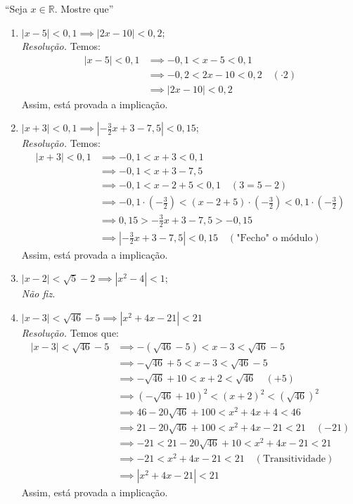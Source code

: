\enquote{Seja $x \in \mathbb{R}$. Mostre que}
\begin{enumerate}
    \item $|x - 5| < 0,1 \implies |2x - 10| < 0,2$;
    \\ \emph{Resolução.} Temos:
    \begin{align*}
        |x - 5| < 0,1 & \implies
        -0,1 < x - 5 < 0,1 \\ & \implies
        -0,2 < 2x - 10 < 0,2 \quad (\cdot 2) \\ & \implies
        |2x - 10| < 0,2
    \end{align*}
    Assim, está provada a implicação.
    \item $|x + 3| < 0,1 \implies |-\frac{3}{2}x + 3 - 7,5| < 0,15$;
    \\ \emph{Resolução.} Temos:
    \begin{align*}
        |x + 3| < 0,1 & \implies -0,1 < x + 3 < 0,1 \\ & \implies
        -0,1 < x + 3 - 7,5 \\ & \implies
        -0,1 < x - 2 + 5 < 0,1 \quad (3 = 5 - 2) \\ & \implies 
        -0,1 \cdot (-\frac{3}{2}) < (x - 2 + 5) \cdot (-\frac{3}{2}) < 0,1 \cdot (-\frac{3}{2}) \\ & \implies
        0,15 > -\frac{3}{2}x + 3 - 7,5 > -0,15 \\ & \implies
        |-\frac{3}{2}x + 3 - 7,5| < 0,15 \quad (\text{"Fecho" o módulo})
    \end{align*}
    Assim, está provada a implicação.
    \item $|x - 2| < \sqrt{5} - 2 \implies |x^2 - 4| < 1$;
    \\ \emph{Não fiz.}
    \item $|x -3| < \sqrt{46} - 5 \implies |x^2 + 4x - 21| < 21$
    \\ \emph{Resolução.} Temos que:
    \begin{align*}
        |x - 3| < \sqrt{46} - 5 & \implies
        -(\sqrt{46} - 5) < x - 3 < \sqrt{46} -5 \\ & \implies
         -\sqrt{46} + 5 < x - 3 < \sqrt{46} -5 \\ & \implies
         -\sqrt{46} +10 < x + 2 < \sqrt{46} \quad (+5) \\ & \implies
         (-\sqrt{46} + 10)^2 < (x + 2)^2 < (\sqrt{46})^2 \\ & \implies
         46 - 20\sqrt{46} + 100 < x^2 + 4x + 4 < 46 \\ & \implies
         21 - 20\sqrt{46} + 100 < x^2 + 4x - 21 < 21 \quad (-21) \\ & \implies
         -21 < 21 - 20 \sqrt{46} + 10 < x^2 + 4x - 21 < 21 \\ & \implies 
         -21 < x^2 + 4x - 21 < 21
         \quad (\text{Transitividade}) \\ & \implies
         |x^2 + 4x - 21| < 21
    \end{align*}
    Assim, está provada a implicação.
\end{enumerate}
